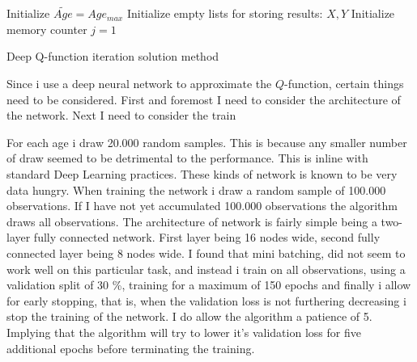 \begin{algorithm}[H]
\SetAlgoLined
{}
 Initialize $\tilde{Age} = Age_{max}$\;
 Initialize empty lists for storing results: $X, Y$\;
 Initialize memory counter $j=1$\;
 \caption{Deep Q-function iteration solution method}
 \end{algorithm}

Since i use a deep neural network to approximate the $Q$-function, certain things need to be considered. First and foremost I need to consider the architecture of the network. Next I need to consider the train

For each age i draw 20.000 random samples. This is because any smaller number of draw seemed to be detrimental to the performance. This is inline with standard Deep Learning practices. These kinds of network is known to be very data hungry. When training the network i draw a random sample of 100.000 observations. If I have not yet accumulated 100.000 observations the algorithm draws all observations. The architecture of network is fairly simple being a two-layer fully connected network. First layer being 16 nodes wide, second fully connected layer being 8 nodes wide. I found that mini batching, did not seem to work well on this particular task, and instead i train on all observations, using a validation split of 30 \%, training for a maximum of 150 epochs and finally i allow for early stopping, that is, when the validation loss is not furthering decreasing i stop the training of the network. I do allow the algorithm a patience of 5. Implying that the algorithm will try to lower it's validation loss for five additional epochs before terminating the training.


